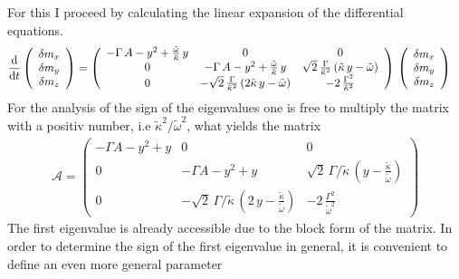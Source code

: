 \documentclass{article}
\begin{document}
For this I proceed by calculating the linear expansion of the differential equations.
\begin{align*}
    \frac{\text{d}}{\text{d}t}\left(\begin{array}{c}
         \delta m_x\\
         \delta m_y\\
         \delta m_z
    \end{array}\right)&=\left( \begin{array}{ccc}
        -\Gamma\,A-y^2+\frac{\tilde{\omega}}{\tilde{\kappa}}\,y&  0 & 0\\
        0 & -\Gamma\,A-y^2+\frac{\tilde{\omega}}{\tilde{\kappa}}\,y & \sqrt{2}\,\frac{\Gamma}{\tilde{\kappa}^2}\,(\tilde{\kappa}\,y-\tilde{\omega})\\
        0 &  -\sqrt{2}\,\frac{\Gamma}{\tilde{\kappa}^2}\,(2\tilde{\kappa}\,y-\tilde{\omega}) & -2\,\frac{\Gamma^2}{\tilde{\kappa}^2}
    \end{array} \right)\,\left(\begin{array}{c}
         \delta m_x\\
         \delta m_y\\
         \delta m_z
    \end{array}\right)
\end{align*}
For the analysis of the sign of the eigenvalues one is free to multiply the matrix with a positiv number, i.e $\tilde{\kappa}^2/\tilde{\omega}^2$, what yields the matrix
\begin{align*}
    \mathcal{A}=\left( \begin{array}{ccc}
        -\Gamma A-{y}^2+{y}&  0 & 0\\
        0 & -\Gamma A-{y}^2+{y}& \sqrt{2}\,\Gamma/\tilde{\kappa}\,({y}-\frac{\tilde{\kappa}}{\tilde{\omega}})\\
        0 &  -\sqrt{2}\,\Gamma/\tilde{\kappa}\,(2\,{y}-\frac{\tilde{\kappa}}{\tilde{\omega}}) & -2\,\frac{\Gamma^2}{\tilde{\omega}^2}
    \end{array} \right)
\end{align*}\newpage
The first eigenvalue is already accessible due to the block form of the matrix. In order to determine the sign of the first eigenvalue in general, it is convenient to define an even more general parameter
\end{document}
